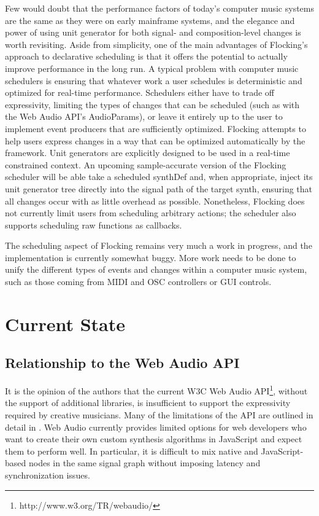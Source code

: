 \documentclass{article}
\begin{document}
Few would doubt that the performance factors of today's computer music systems are the same as they were on early mainframe systems, and the elegance and power of using unit generator for both signal- and composition-level changes is worth revisiting. Aside from simplicity, one of the main advantages of Flocking's approach to declarative scheduling is that it offers the potential to actually improve performance in the long run. A typical problem with computer music schedulers is ensuring that whatever work a user schedules is deterministic and optimized for real-time performance. Schedulers either have to trade off expressivity, limiting the types of changes that can be scheduled (such as with the Web Audio API's AudioParams), or leave it entirely up to the user to implement event producers that are sufficiently optimized. Flocking attempts to help users express changes in a way that can be optimized automatically by the framework. Unit generators are explicitly designed to be used in a real-time constrained context. An upcoming sample-accurate version of the Flocking scheduler will be able take a scheduled synthDef and, when appropriate, inject its unit generator tree directly into the signal path of the target synth, ensuring that all changes occur with as little overhead as possible. Nonetheless, Flocking does not currently limit users from scheduling arbitrary actions; the scheduler also supports scheduling raw functions as callbacks.

The scheduling aspect of Flocking remains very much a work in progress, and the implementation is currently somewhat buggy. More work needs to be done to unify the different types of events and changes within a computer music system, such as those coming from MIDI and OSC controllers or GUI controls.

\section{Current State}

\subsection{Relationship to the Web Audio API}

It is the opinion of the authors that the current W3C Web Audio API\footnote{http://www.w3.org/TR/webaudio/}, without the support of additional libraries, is insufficient to support the expressivity required by creative musicians. Many of the limitations of the API are outlined in detail in \cite{DBLP:journals/comj/WyseS13}. Web Audio currently provides limited options for web developers who want to create their own custom synthesis algorithms in JavaScript and expect them to perform well. In particular, it is difficult to mix native and JavaScript-based nodes in the same signal graph without imposing latency and synchronization issues.
\end{document}
